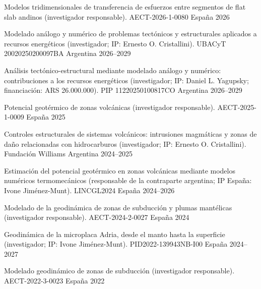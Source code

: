 
\begingroup
\renewcommand{\arraystretch}{1.10}
\renewcommand*{\honorpositionstyle}[1]{{\fontsize{9pt}{10.8pt}\bodyfont\mdseries\color{darktext} #1}}
\begin{cvhonors}

\cvhonor
    {Modelos tridimensionales de transferencia de esfuerzos entre segmentos de flat slab andinos (investigador responsable).}
    {AECT-2026-1-0080}
    {España}
    {2026}

\cvhonor
    {Modelado análogo y numérico de problemas tectónicos y estructurales aplicados a recursos energéticos (investigador; IP: Ernesto O. Cristallini).}
    {UBACyT 20020250200097BA}
    {Argentina}
    {2026--2029}

\cvhonor
    {Análisis tectónico-estructural mediante modelado análogo y numérico: contribuciones a los recursos energéticos (investigador; IP: Daniel L. Yagupsky; financiación: ARS 26.000.000).}
    {PIP 11220250100817CO}
    {Argentina}
    {2026--2029}

\cvhonor
    {Potencial geotérmico de zonas volcánicas (investigador responsable).}
    {AECT-2025-1-0009}
    {España}
    {2025}

\cvhonor
    {Controles estructurales de sistemas volcánicos: intrusiones magmáticas y zonas de daño relacionadas con hidrocarburos (investigador; IP: Ernesto O. Cristallini).}
    {Fundación Williams}
    {Argentina}
    {2024--2025}

\cvhonor
    {Estimación del potencial geotérmico en zonas volcánicas mediante modelos numéricos termomecánicos (responsable de la contraparte argentina; IP España: Ivone Jiménez-Munt).}
    {LINCGL2024}
    {España}
    {2024--2026}

\cvhonor
    {Modelado de la geodinámica de zonas de subducción y plumas mantélicas (investigador responsable).}
    {AECT-2024-2-0027}
    {España}
    {2024}

\cvhonor
    {Geodinámica de la microplaca Adria, desde el manto hasta la superficie (investigador; IP: Ivone Jiménez-Munt).}
    {PID2022-139943NB-I00}
    {España}
    {2024--2027}

\cvhonor
    {Modelado geodinámico de zonas de subducción (investigador responsable).}
    {AECT-2022-3-0023}
    {España}
    {2022}


\end{cvhonors}
